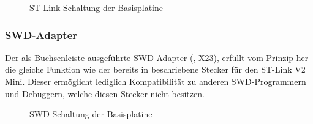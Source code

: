 \begin{figure}[htb]
    \centering
    \qquad
    \qquad
    \caption[ST-Link Schaltung der Basisplatine]{ST-Link Schaltung der \gls{Basisplatine}}
    \label{fig:basisplatine-swd}
\end{figure}

\subsubsection{SWD-Adapter}
Der als Buchsenleiste ausgeführte SWD-Adapter (, X23), erfüllt vom Prinzip her die gleiche Funktion wie der bereits in  beschriebene Stecker für den ST-Link V2 Mini. Dieser ermöglicht lediglich Kompatibilität zu anderen SWD-Programmern und Debuggern, welche diesen Stecker nicht besitzen.

\begin{figure}[htb]
    \centering
    \qquad
    \qquad
    \caption[SWD-Schaltung der Basisplatine]{SWD-Schaltung der \gls{Basisplatine}}
    \label{fig:basisplatine-swd2}
\end{figure}

